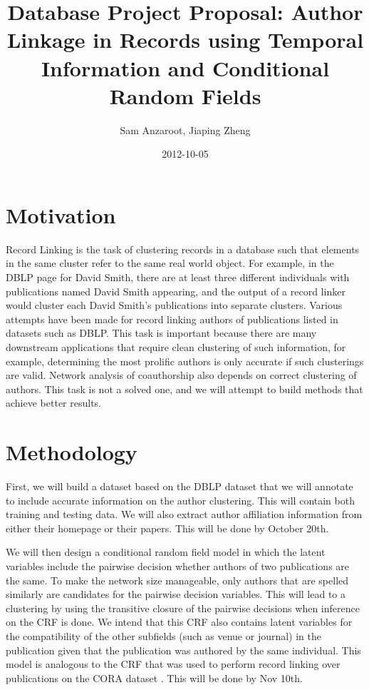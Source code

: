 \documentclass[]{article}
\title{Database Project Proposal: Author Linkage in Records using Temporal Information and Conditional Random Fields}
\author{Sam Anzaroot, Jiaping Zheng}
\date{2012-10-05}
\begin{document}
\ifpdf
{}
\else
{}
\fi

\maketitle

\section{Motivation} %
\label{sec:motivation}
Record Linking is the task of clustering records in a database such that elements in the same cluster refer to the same real world object. For example, in the DBLP page for David Smith, there are at least three different individuals with publications named David Smith appearing, and the output of a record linker would cluster each David Smith's publications into separate clusters. Various attempts have been made for record linking authors of publications listed in datasets such as DBLP. This task is important because there are many downstream applications that require clean clustering of such information, for example, determining the most prolific authors is only accurate if such clusterings are valid. Network analysis of coauthorship also depends on correct clustering of authors. This task is not a solved one, and we will attempt to build methods that achieve better results.

\section{Methodology} %
\label{sec:methodology}
First, we will build a dataset based on the DBLP dataset that we will annotate to include accurate information on the author clustering. This will contain both training and testing data. We will also extract author affiliation information from either their homepage or their papers.
This will be done by October 20th.

We will then design a conditional random field model in which the latent variables include the pairwise decision whether authors of two publications are the same. To make the network size manageable, only authors that are spelled similarly are candidates for the pairwise decision variables. This will lead to a clustering by using the transitive closure of the pairwise decisions when inference on the CRF is done. We intend that this CRF also contains latent variables for the compatibility of the other subfields (such as venue or journal) in the publication given that the publication was authored by the same individual. This model is analogous to the CRF that was used to perform record linking over publications on the CORA dataset \cite{Domingos04multi}.
This will be done by Nov 10th.
\end{document}
